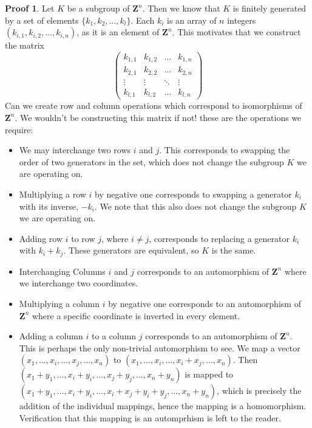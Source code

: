 \documentclass[12pt]{amsbook}
\theoremstyle{definition}
\newtheorem*{prf}{Proof}
\newcommand{\bint}{\mathbf{Z}} %
\begin{document}
\begin{prf}
    Let $K$ be a subgroup of $\bint^n$. Then we know that $K$ is finitely generated by a set of elements $\{ k_1, k_2, \dots, k_l \}$. Each $k_i$ is an array of $n$ integers $(k_{i,1}, k_{i,2}, \dots, k_{i,n})$, as it is an element of $\bint^n$. This motivates that we construct the matrix
    \[ \begin{pmatrix} k_{1,1} & k_{1,2} & \dots  & k_{1,n}\\
                       k_{2,1} & k_{2,2} & \dots  & k_{2,n}\\
                       \vdots  & \vdots  & \ddots & \vdots\\
                       k_{l,1} & k_{l,2} & \dots  & k_{l,n} \end{pmatrix} \]
    Can we create row and column operations which correspond to isomorphisms of $\bint^n$. We wouldn't be constructing this matrix if not! these are the operations we require:
    \begin{itemize}
        \item We may interchange two rows $i$ and $j$. This corresponds to swapping the order of two generators in the set, which does not change the subgroup $K$ we are operating on.
        \item Multiplying a row $i$ by negative one corresponds to swapping a generator $k_i$ with its inverse, $-k_i$. We note that this also does not change the subgroup $K$ we are operating on.
        \item Adding row $i$ to row $j$, where $i \neq j$, corresponds to replacing a generator $k_i$ with $k_i + k_j$. These generators are equivalent, so $K$ is the same.
        \item Interchanging Columns $i$ and $j$ corresponds to an automorphism of $\bint^n$ where we interchange two coordinates.
        \item Multiplying a column $i$ by negative one corresponds to an automorphism of $\bint^n$ where a specific coordinate is inverted in every element.
        \item Adding a column $i$ to a column $j$ corresponds to an automorphism of $\bint^n$. This is perhaps the only non-trivial automorphism to see. We map a vector $(x_1,\dots,x_i,\dots,x_j,\dots,x_n)$ to $(x_1,\dots,x_i, \dots, x_i + x_j, \dots, x_n)$. Then $(x_1 + y_1,\dots,x_i + y_i,\dots,x_j + y_j,\dots,x_n + y_n)$ is mapped to $(x_1 + y_1,\dots,x_i + y_i,\dots,x_i + x_j + y_i + y_j,\dots,x_n + y_n)$, which is precisely the addition of the individual mappings, hence the mapping is a homomorphism. Verification that this mapping is an automprhism is left to the reader.

\end{itemize}
\end{prf}
\end{document}
